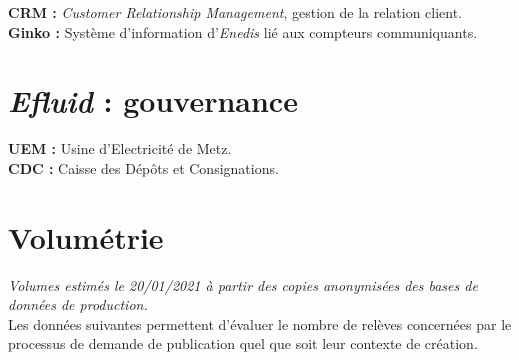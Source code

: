 \documentclass[a4paper, 12pt]{report}
\begin{document}
\vspace{1cm}
\noindent\textbf{CRM :} \textit{Customer Relationship Management}, gestion de la relation client.\\
\noindent\textbf{Ginko :} Système d'information d'\textit{Enedis} lié aux compteurs communiquants.

\chapter{\textit{Efluid} : gouvernance}
\label{appendix:efluid-gouvernance}

\begin{center}
\end{center}

\vspace{1cm}
\noindent\textbf{UEM :} Usine d'Electricité de Metz.\\
\noindent\textbf{CDC :} Caisse des Dépôts et Consignations.

\chapter{Volumétrie}
\label{appendix:volumetrie}

\textit{Volumes estimés le 20/01/2021 à partir des copies anonymisées des bases de données de production.}\\

Les données suivantes permettent d’évaluer le nombre de relèves concernées par le processus de demande de publication quel que soit leur contexte de création.\\
\end{document}
